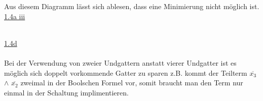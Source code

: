 \documentclass[a4paper,10pt]{scrartcl}
\begin{document}
\\\\
Aus diesem Diagramm lässt sich ablesen, dass eine Minimierung nicht möglich ist.
\newpage
\noindent
\underline{1.4a iii}\\\\
\underline{1.4d}\\\\
Bei der Verwendung von zweier Undgattern anstatt vierer Undgatter ist es möglich sich doppelt vorkommende Gatter zu sparen z.B. kommt der Teilterm $\overline{x_{3}}$ $\land$ $\overline{x_{2}}$ zweimal in der Boolschen Formel vor, somit braucht man den Term nur einmal in der Schaltung implimentieren.\\\\
\end{document}
